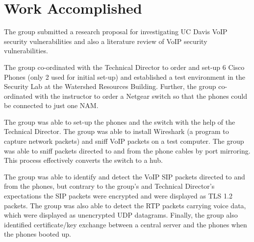 \section{Work Accomplished}


The group submitted a research proposal for investigating UC Davis VoIP security vulnerabilities and also a literature review of VoIP security vulnerabilities.

 The group co-ordinated with the Technical Director to order and set-up 6 Cisco Phones (only 2 used for initial set-up) and established a test environment in the Security Lab at the Watershed Resources Building. Further, the group co-ordinated with the instructor to order a Netgear switch so that the phones could be connected to  just one NAM.
 
 The group was able to set-up the phones and the switch with the help of the Technical Director. The group was able to install Wireshark (a program to capture network packets) and sniff VoIP packets on a test computer. The group was able to sniff packets directed to and from the phone cables by port mirroring. This process effectively converts the switch to a hub. 
 
 The group was able to identify and detect the VoIP SIP packets directed to and from the phones, but contrary to the group's and Technical Director's expectations the SIP packets were encrypted and were displayed as TLS 1.2 packets. The group was also able to detect the RTP packets carrying voice data, which were displayed as unencrypted UDP datagrams. Finally, the group also identified certificate/key exchange between a central server and the phones when the phones booted up.
 
 
 